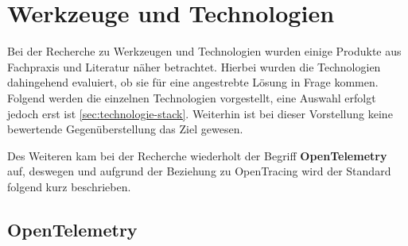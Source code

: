 
\section{Werkzeuge und Technologien}
\label{sec:werkzeuge-und-technologien}

%
%


Bei der Recherche zu Werkzeugen und Technologien wurden einige Produkte aus Fachpraxis und Literatur näher betrachtet. Hierbei wurden die Technologien dahingehend evaluiert, ob sie für eine angestrebte Lösung in Frage kommen. Folgend werden die einzelnen Technologien vorgestellt, eine Auswahl erfolgt jedoch erst ist \autoref{sec:technologie-stack}. Weiterhin ist bei dieser Vorstellung keine bewertende Gegenüberstellung das Ziel gewesen.

Des Weiteren kam bei der Recherche wiederholt der Begriff \textbf{OpenTelemetry} auf, deswegen und aufgrund der Beziehung zu OpenTracing wird der Standard folgend kurz beschrieben.

\newpage

\subsection{OpenTelemetry}


